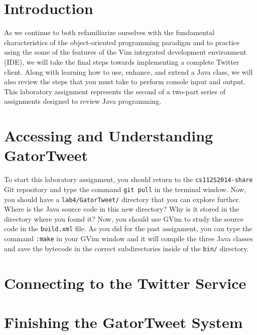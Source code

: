 


\usepackage[compact]{titlesec}



\section*{Introduction}

As we continue to both refamiliarize ourselves with the fundamental characteristics of the object-oriented programming paradigm
and to practice using the some of the features of the Vim integrated development environment (IDE), we will take the final steps
towards implementing a complete Twitter client.  Along with learning how to use, enhance, and extend a Java class, we will also
review the steps that you must take to perform console input and output. This laboratory assignment represents the second of a
two-part series of assignments designed to review Java programming.

\section*{Accessing and Understanding GatorTweet}

To start this laboratory assignment, you should return to the {\tt cs112S2014-share} Git repository and type the command {\tt git
  pull} in the terminal window.  Now, you should have a {\tt lab4/GatorTweet/} directory that you can explore further.  Where is
the Java source code in this new directory? Why is it stored in the directory where you found it? Now, you should use GVim to
study the source code in the {\tt build.xml} file.  As you did for the past assignment, you can type the command {\tt :make} in
your GVim window and it will compile the three Java classes and save the bytecode in the correct subdirectories inside of the
{\tt bin/} directory. 

\section*{Connecting to the Twitter Service}



\section*{Finishing the GatorTweet System}

